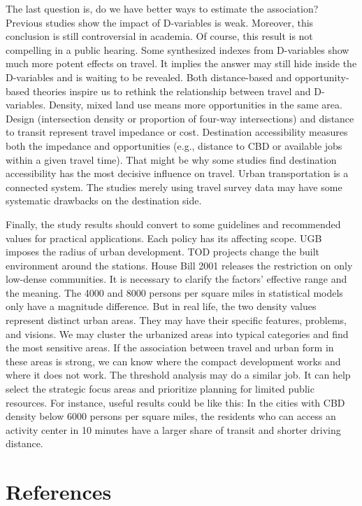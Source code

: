 \documentclass[
  12pt,
]{article}
\begin{document}
The last question is, do we have better ways to estimate the association? Previous studies show the impact of D-variables is weak. Moreover, this conclusion is still controversial in academia. Of course, this result is not compelling in a public hearing. Some synthesized indexes from D-variables show much more potent effects on travel. It implies the answer may still hide inside the D-variables and is waiting to be revealed. Both distance-based and opportunity-based theories inspire us to rethink the relationship between travel and D-variables. Density, mixed land use means more opportunities in the same area. Design (intersection density or proportion of four-way intersections) and distance to transit represent travel impedance or cost. Destination accessibility measures both the impedance and opportunities (e.g., distance to CBD or available jobs within a given travel time). That might be why some studies find destination accessibility has the most decisive influence on travel. Urban transportation is a connected system. The studies merely using travel survey data may have some systematic drawbacks on the destination side.

Finally, the study results should convert to some guidelines and recommended values for practical applications. Each policy has its affecting scope. UGB imposes the radius of urban development. TOD projects change the built environment around the stations. House Bill 2001 releases the restriction on only low-dense communities. It is necessary to clarify the factors' effective range and the meaning. The 4000 and 8000 persons per square miles in statistical models only have a magnitude difference. But in real life, the two density values represent distinct urban areas. They may have their specific features, problems, and visions. We may cluster the urbanized areas into typical categories and find the most sensitive areas. If the association between travel and urban form in these areas is strong, we can know where the compact development works and where it does not work. The threshold analysis may do a similar job. It can help select the strategic focus areas and prioritize planning for limited public resources. For instance, useful results could be like this: In the cities with CBD density below 6000 persons per square miles, the residents who can access an activity center in 10 minutes have a larger share of transit and shorter driving distance.

\hypertarget{references}{%
\section*{References}\label{references}}
\end{document}
